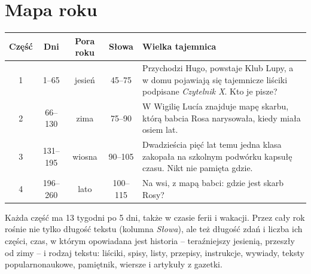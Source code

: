 \section*{Mapa roku}

\begin{center}
\renewcommand{\arraystretch}{1.4}
\begin{tabularx}{\linewidth}{@{}c c c c >{\raggedright\arraybackslash}X@{}}
\toprule
\textbf{Część} & \textbf{Dni} & \textbf{Pora roku} & \textbf{Słowa} & \textbf{Wielka tajemnica} \\
\midrule
1 & 1--65   & jesień & 45--75 & Przychodzi Hugo, powstaje Klub Lupy, a
w domu pojawiają się tajemnicze liściki podpisane \textit{Czytelnik X}.
Kto je pisze? \\
2 & 66--130 & zima & 75--90 & W Wigilię Lucía znajduje mapę skarbu,
którą babcia Rosa narysowała, kiedy miała osiem lat. \\
3 & 131--195 & wiosna & 90--105 & Dwadzieścia pięć lat temu jedna klasa
zakopała na szkolnym podwórku kapsułę czasu. Nikt nie pamięta gdzie. \\
4 & 196--260 & lato & 100--115 & Na wsi, z mapą babci: gdzie jest skarb
Rosy? \\
\bottomrule
\end{tabularx}
\end{center}

\vspace{6mm}
Każda część ma 13 tygodni po 5 dni, także w czasie ferii i wakacji.
Przez cały rok rośnie nie tylko długość tekstu (kolumna
\textit{Słowa}), ale też długość zdań i liczba ich części, czas, w
którym opowiadana jest historia -- teraźniejszy jesienią, przeszły od
zimy -- i rodzaj tekstu: liściki, spisy, listy, przepisy,
instrukcje, wywiady, teksty popularnonaukowe, pamiętnik, wiersze i
artykuły z gazetki.
\newpage

